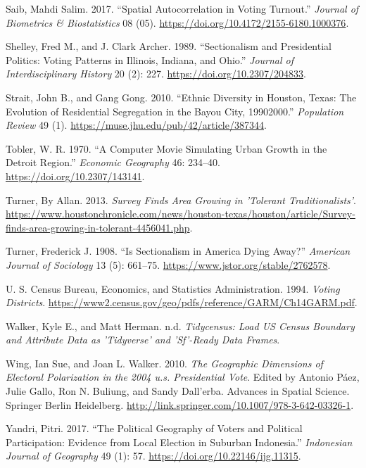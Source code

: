 \documentclass[
]{article}
\newlength{\cslhangindent}
\newenvironment{CSLReferences}[2] %
 {\begin{list}{}{%
  \setlength{\itemindent}{0pt}
  \setlength{\leftmargin}{0pt}
  \setlength{\parsep}{0pt}
  \ifodd #1
   \setlength{\leftmargin}{\cslhangindent}
   \setlength{\itemindent}{-1\cslhangindent}
  \fi
  \setlength{\itemsep}{#2\baselineskip}}}
 {\end{list}}
\begin{document}
\begin{CSLReferences}{1}{1}
Saib, Mahdi Salim. 2017. {``Spatial Autocorrelation in Voting
Turnout.''} \emph{Journal of Biometrics \& Biostatistics} 08 (05).
\url{https://doi.org/10.4172/2155-6180.1000376}.

Shelley, Fred M., and J. Clark Archer. 1989. {``Sectionalism and
Presidential Politics: Voting Patterns in Illinois, Indiana, and
Ohio.''} \emph{Journal of Interdisciplinary History} 20 (2): 227.
\url{https://doi.org/10.2307/204833}.

Strait, John B., and Gang Gong. 2010. {``Ethnic Diversity in Houston,
Texas: The Evolution of Residential Segregation in the Bayou City,
1990{\textendash}2000.''} \emph{Population Review} 49 (1).
\url{https://muse.jhu.edu/pub/42/article/387344}.

Tobler, W. R. 1970. {``A Computer Movie Simulating Urban Growth in the
Detroit Region.''} \emph{Economic Geography} 46: 234--40.
\url{https://doi.org/10.2307/143141}.

Turner, By Allan. 2013. \emph{Survey Finds Area Growing in 'Tolerant
Traditionalists'}.
\url{https://www.houstonchronicle.com/news/houston-texas/houston/article/Survey-finds-area-growing-in-tolerant-4456041.php}.

Turner, Frederick J. 1908. {``Is Sectionalism in America Dying Away?''}
\emph{American Journal of Sociology} 13 (5): 661--75.
\url{https://www.jstor.org/stable/2762578}.

U. S. Census Bureau, Economics, and Statistics Administration. 1994.
\emph{Voting Districts}.
\url{https://www2.census.gov/geo/pdfs/reference/GARM/Ch14GARM.pdf}.

Walker, Kyle E., and Matt Herman. n.d. \emph{Tidycensus: Load US Census
Boundary and Attribute Data as 'Tidyverse' and 'Sf'-Ready Data Frames}.

Wing, Ian Sue, and Joan L. Walker. 2010. \emph{The Geographic Dimensions
of Electoral Polarization in the 2004 u.s. Presidential Vote}. Edited by
Antonio Páez, Julie Gallo, Ron N. Buliung, and Sandy Dall'erba. Advances
in Spatial Science. Springer Berlin Heidelberg.
\url{http://link.springer.com/10.1007/978-3-642-03326-1}.

Yandri, Pitri. 2017. {``The Political Geography of Voters and Political
Participation: Evidence from Local Election in Suburban Indonesia.''}
\emph{Indonesian Journal of Geography} 49 (1): 57.
\url{https://doi.org/10.22146/ijg.11315}.

\end{CSLReferences}
\end{document}
